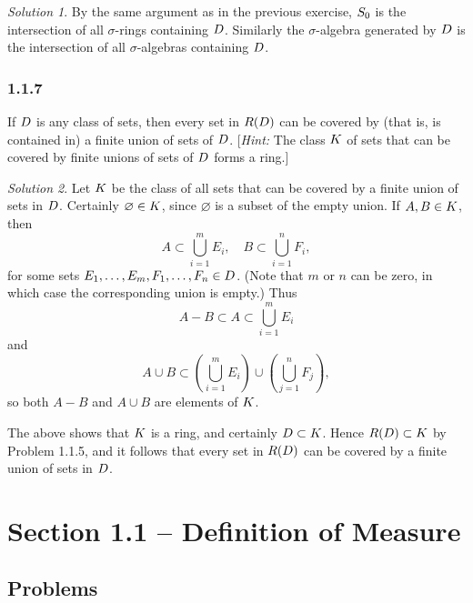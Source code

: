 \documentclass{report}
\let\sc\relax
\newcommand{\sc}[1]{\mathscr{#1}}
\theoremstyle{remark}
\newtheorem*{solution}{Solution}
\begin{document}
\begin{solution}
  By the same argument as in the previous exercise, $\sc S_0$ is the intersection of all $\sigma$-rings containing $\sc D$. Similarly the $\sigma$-algebra generated by $\sc D$ is the intersection of all $\sigma$-algebras containing $\sc D$.
\end{solution}

\subsubsection*{1.1.7}
If $\sc D$ is any class of sets, then every set in $\sc R(\sc D)$ can be covered by (that is, is contained in) a finite union of sets of $\sc D$. [\emph{Hint:} The class $\sc K$ of sets that can be covered by finite unions of sets of $\sc D$ forms a ring.]

\begin{solution}
  Let $\sc K$ be the class of all sets that can be covered by a finite union of sets in $\sc D$. Certainly $\varnothing \in \sc K$, since $\varnothing$ is a subset of the empty union. If $A, B \in \sc K$, then
  \begin{equation*}
    A \subset \bigcup_{i=1}^m E_i, \quad B \subset \bigcup_{i=1}^n F_i,
  \end{equation*}
  for some sets $E_1, \dots, E_m, F_1, \dots, F_n \in \sc D$. (Note that $m$ or $n$ can be zero, in which case the corresponding union is empty.) Thus
  \begin{equation*}
    A - B \subset A \subset \bigcup_{i=1}^m E_i
  \end{equation*}
  and
  \begin{equation*}
    A \cup B \subset \left( \bigcup_{i=1}^m E_i \right) \cup \left( \bigcup_{j=1}^n F_j \right),
  \end{equation*}
  so both $A - B$ and $A \cup B$ are elements of $\sc K$.

  The above shows that $\sc K$ is a ring, and certainly $\sc D \subset \sc K$. Hence $\sc R(\sc D) \subset \sc K$ by Problem 1.1.5, and it follows that every set in $\sc R(\sc D)$ can be covered by a finite union of sets in $\sc D$.
\end{solution}

\section*{Section 1.1 -- Definition of Measure}

\subsection*{Problems}
\end{document}
